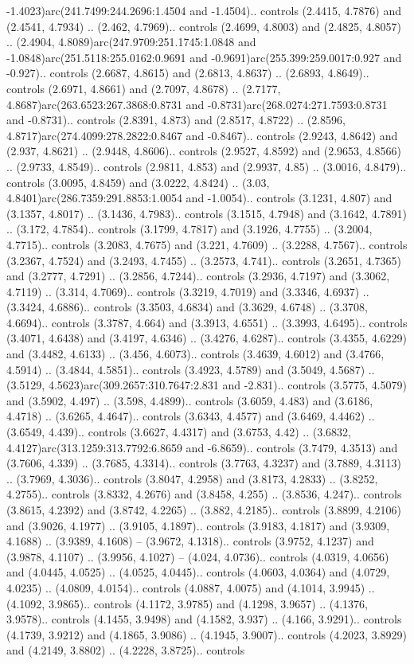 -1.4023)arc(241.7499:244.2696:1.4504 and -1.4504).. controls (2.4415, 4.7876) and (2.4541, 4.7934) .. (2.462, 4.7969).. controls (2.4699, 4.8003) and (2.4825, 4.8057) .. (2.4904, 4.8089)arc(247.9709:251.1745:1.0848 and -1.0848)arc(251.5118:255.0162:0.9691 and -0.9691)arc(255.399:259.0017:0.927 and -0.927).. controls (2.6687, 4.8615) and (2.6813, 4.8637) .. (2.6893, 4.8649).. controls (2.6971, 4.8661) and (2.7097, 4.8678) .. (2.7177, 4.8687)arc(263.6523:267.3868:0.8731 and -0.8731)arc(268.0274:271.7593:0.8731 and -0.8731).. controls (2.8391, 4.873) and (2.8517, 4.8722) .. (2.8596, 4.8717)arc(274.4099:278.2822:0.8467 and -0.8467).. controls (2.9243, 4.8642) and (2.937, 4.8621) .. (2.9448, 4.8606).. controls (2.9527, 4.8592) and (2.9653, 4.8566) .. (2.9733, 4.8549).. controls (2.9811, 4.853) and (2.9937, 4.85) .. (3.0016, 4.8479).. controls (3.0095, 4.8459) and (3.0222, 4.8424) .. (3.03, 4.8401)arc(286.7359:291.8853:1.0054 and -1.0054).. controls (3.1231, 4.807) and (3.1357, 4.8017) .. (3.1436, 4.7983).. controls (3.1515, 4.7948) and (3.1642, 4.7891) .. (3.172, 4.7854).. controls (3.1799, 4.7817) and (3.1926, 4.7755) .. (3.2004, 4.7715).. controls (3.2083, 4.7675) and (3.221, 4.7609) .. (3.2288, 4.7567).. controls (3.2367, 4.7524) and (3.2493, 4.7455) .. (3.2573, 4.741).. controls (3.2651, 4.7365) and (3.2777, 4.7291) .. (3.2856, 4.7244).. controls (3.2936, 4.7197) and (3.3062, 4.7119) .. (3.314, 4.7069).. controls (3.3219, 4.7019) and (3.3346, 4.6937) .. (3.3424, 4.6886).. controls (3.3503, 4.6834) and (3.3629, 4.6748) .. (3.3708, 4.6694).. controls (3.3787, 4.664) and (3.3913, 4.6551) .. (3.3993, 4.6495).. controls (3.4071, 4.6438) and (3.4197, 4.6346) .. (3.4276, 4.6287).. controls (3.4355, 4.6229) and (3.4482, 4.6133) .. (3.456, 4.6073).. controls (3.4639, 4.6012) and (3.4766, 4.5914) .. (3.4844, 4.5851).. controls (3.4923, 4.5789) and (3.5049, 4.5687) .. (3.5129, 4.5623)arc(309.2657:310.7647:2.831 and -2.831).. controls (3.5775, 4.5079) and (3.5902, 4.497) .. (3.598, 4.4899).. controls (3.6059, 4.483) and (3.6186, 4.4718) .. (3.6265, 4.4647).. controls (3.6343, 4.4577) and (3.6469, 4.4462) .. (3.6549, 4.439).. controls (3.6627, 4.4317) and (3.6753, 4.42) .. (3.6832, 4.4127)arc(313.1259:313.7792:6.8659 and -6.8659).. controls (3.7479, 4.3513) and (3.7606, 4.339) .. (3.7685, 4.3314).. controls (3.7763, 4.3237) and (3.7889, 4.3113) .. (3.7969, 4.3036).. controls (3.8047, 4.2958) and (3.8173, 4.2833) .. (3.8252, 4.2755).. controls (3.8332, 4.2676) and (3.8458, 4.255) .. (3.8536, 4.247).. controls (3.8615, 4.2392) and (3.8742, 4.2265) .. (3.882, 4.2185).. controls (3.8899, 4.2106) and (3.9026, 4.1977) .. (3.9105, 4.1897).. controls (3.9183, 4.1817) and (3.9309, 4.1688) .. (3.9389, 4.1608) -- (3.9672, 4.1318).. controls (3.9752, 4.1237) and (3.9878, 4.1107) .. (3.9956, 4.1027) -- (4.024, 4.0736).. controls (4.0319, 4.0656) and (4.0445, 4.0525) .. (4.0525, 4.0445).. controls (4.0603, 4.0364) and (4.0729, 4.0235) .. (4.0809, 4.0154).. controls (4.0887, 4.0075) and (4.1014, 3.9945) .. (4.1092, 3.9865).. controls (4.1172, 3.9785) and (4.1298, 3.9657) .. (4.1376, 3.9578).. controls (4.1455, 3.9498) and (4.1582, 3.937) .. (4.166, 3.9291).. controls (4.1739, 3.9212) and (4.1865, 3.9086) .. (4.1945, 3.9007).. controls (4.2023, 3.8929) and (4.2149, 3.8802) .. (4.2228, 3.8725).. controls 